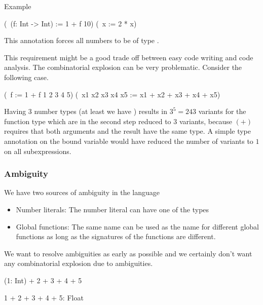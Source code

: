 Example

\begin{alba}
    (\ (f: Int -> Int) := 1 + f 10) (\ x := 2 * x)
\end{alba}

This annotation forces all numbers to be of type .

This requirement might be a good trade off between easy code writing and code
analysis. The combinatorial explosion can be very problematic. Consider the
following case.

\begin{alba}
    (\ f := 1 + f 1 2 3 4 5) (\ x1 x2 x3 x4 x5 := x1 + x2 + x3 + x4 + x5)
\end{alba}

Having 3 number types (at least we have ) results in
$3^5 = 243$ variants for the function type which are in the second step reduced
to $3$ variants, because $(+)$ requires that both arguments and the result have
the same type. A simple type annotation on the bound variable  would
have reduced the number of variants to $1$ on all subexpressions.







\vskip 5mm
\subsubsection{Ambiguity}

We have two sources of ambiguity in the language

\begin{itemize}

\item Number literals: The number literal  can have one of the types

\item Global functions: The same name can be used as the name for different
global functions as long as the signatures of the functions are different.

\end{itemize}

We want to resolve ambiguities as early as possible and we certainly don't want
any combinatorial explosion due to ambiguities.

\begin{alba}
    (1: Int) + 2 + 3 + 4 + 5

    1 + 2 + 3 + 4 + 5: Float
\end{alba}

